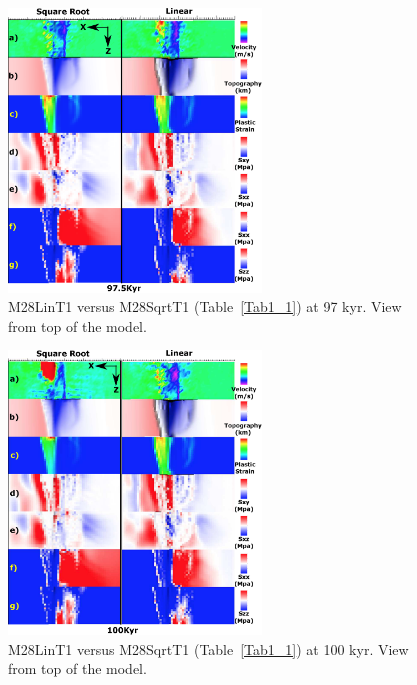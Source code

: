 \begin{figure}[h]
  \centering
    \includegraphics[width=0.6\textwidth]{./Figures/fig_Results4_3_sqrt_vs_lin_cut_back_97kyr.eps}
  \caption{M28LinT1 versus M28SqrtT1 (Table~\hyperref[Tab1_1]{\ref{Tab1_1}}) at 97 kyr. View from top of the model.}
 \label{fig_Results4_3_1}
\end{figure}  

\begin{figure}[h]
  \centering
    \includegraphics[width=0.6\textwidth]{./Figures/fig_Results4_3_sqrt_vs_lin_cut_back_100kyr.eps}
  \caption{M28LinT1 versus M28SqrtT1 (Table~\hyperref[Tab1_1]{\ref{Tab1_1}}) at 100 kyr. View from top of the model.}
 \label{fig_Results4_3_2}
\end{figure} 

